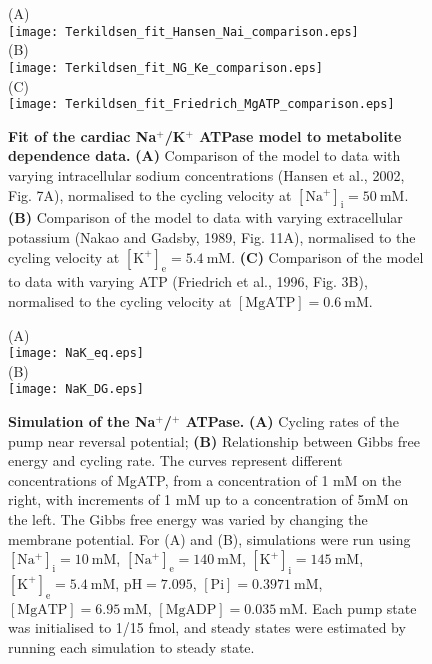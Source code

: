 \documentclass[11pt]{article}
\begin{document}
\begin{figure}
	\centering
	(A) \\
	\texttt{[image: Terkildsen\_fit\_Hansen\_Nai\_comparison.eps]} \\
	(B) \\
	\texttt{[image: Terkildsen\_fit\_NG\_Ke\_comparison.eps]} \\
	(C) \\
	\texttt{[image: Terkildsen\_fit\_Friedrich\_MgATP\_comparison.eps]}
	\caption{\textbf{Fit of the cardiac Na$^+$/K$^+$ ATPase model to metabolite dependence data.} \textbf{(A)} Comparison of the model to data with varying intracellular sodium concentrations  (Hansen et al., 2002, Fig. 7A), normalised to the cycling velocity at $\mathrm{[Na^+]_i = 50\ \mathrm{mM}}$. \textbf{(B)} Comparison of the model to data with varying extracellular potassium (Nakao and Gadsby, 1989, Fig. 11A), normalised to the cycling velocity at $\mathrm{[K^+]_e = 5.4\ \mathrm{mM}}$. \textbf{(C)} Comparison of the model to data with varying ATP  (Friedrich et al., 1996, Fig. 3B), normalised to the cycling velocity at $\mathrm{[MgATP] = 0.6\ \mathrm{mM}}$.} 
\end{figure}

\begin{figure}
	\centering
	(A) \\
	\texttt{[image: NaK\_eq.eps]} \\
	(B) \\
	\texttt{[image: NaK\_DG.eps]}
	\caption{\textbf{Simulation of the Na$^+$/$^+$ ATPase.} \textbf{(A)} Cycling rates of the pump near reversal potential; \textbf{(B)} Relationship between Gibbs free energy and cycling rate. The curves represent different concentrations of MgATP, from a concentration of 1 mM on the right, with increments of 1 mM up to a concentration of 5mM on the left. The Gibbs free energy was varied by changing the membrane potential. For (A) and (B), simulations were run using $\mathrm{[Na^+]_i} = 10\ \mathrm{mM}$, $\mathrm{[Na^+]_e} = 140\ \mathrm{mM}$, $\mathrm{[K^+]_i} = 145\ \mathrm{mM}$, $\mathrm{[K^+]_e} = 5.4\ \mathrm{mM}$, $\mathrm{pH} = 7.095$, $\mathrm{[Pi]} = 0.3971\ \mathrm{mM}$, $\mathrm{[MgATP]} = 6.95\ \mathrm{mM}$, $\mathrm{[MgADP]} = 0.035\ \mathrm{mM}$. Each pump state was initialised to 1/15 fmol, and steady states were estimated by running each simulation to steady state.}
\end{figure}
\end{document}
